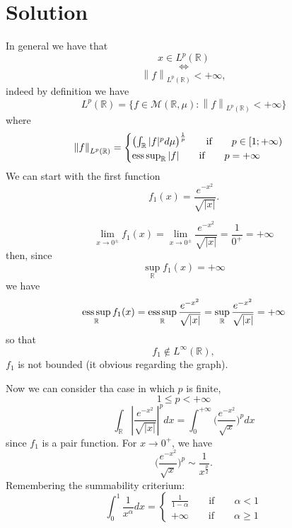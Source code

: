 \documentclass[a4paper, twoside, openany]{book}
\newcommand{\R}{\mathbb{R}}
\newcommand{\esssup}{\operatornamewithlimits{ess\,sup}}
\newcommand{\norm}[1]{\left\lVert#1\right\rVert}
\begin{document}
\section*{Solution}
In general we have that
$$x \in L^p(\R)$$
$$\iff$$
$$\norm{f}_{L^p(\R)} < +\infty,$$
indeed by definition we have
$$L^p(\R) = \{ f \in \mathcal{M}(\R, \mu) : \norm{f}_{L^p(\R)} < +\infty \}$$
where
$$\norm{f}_{L^p(\R)} = \begin{cases}
						\bigl( \int_{\R} |f|^p d \mu \bigl)^{\frac{1}{p}} \qquad \textrm{if} \qquad p \in [1; +\infty) \\
						\esssup_{\R} |f| \qquad \textrm{if} \qquad p = +\infty
					   \end{cases}$$
We can start with the first function
$$f_1(x) = \frac{e^{-x^2}}{\sqrt{|x|}}.$$
\begin{figure}[!ht]
\begin{center}
\end{center}
\end{figure}
$$\lim_{x \rightarrow 0^{\pm}} f_1(x) = \lim_{x \rightarrow 0^{\pm}} \frac{e^{-x^2}}{\sqrt{|x|}} = \frac{1}{0^+} = +\infty$$
then, since
$$\sup_{\R} f_1(x) = +\infty$$
we have
$$\esssup_{\R} f_1(x) = \esssup_{\R} \frac{e^{-x^2}}{\sqrt{|x|}} = \sup_{\R} \frac{e^{-x^2}}{\sqrt{|x|}} = +\infty$$
so that 
$$f_1 \notin L^{\infty}(\R),$$
$f_1$ is not bounded (it obvious regarding the graph). \par  
Now we can consider tha case in which $p$ is finite, 
$$1 \leq p < +\infty$$
$$\int_{\R} |\frac{e^{-x^2}}{\sqrt{|x|}}|^p dx = \int_0^{+\infty} \bigl(\frac{e^{-x^2}}{\sqrt{x}}\bigl)^p dx$$
since $f_1$ is a pair function. For $x \rightarrow 0^+$, we have
$$\bigl(\frac{e^{-x^2}}{\sqrt{x}}\bigl)^p \sim \frac{1}{x^{\frac{p}{2}}}.$$
Remembering the summability criterium:
$$\int_0^1 \frac{1}{x^{\alpha}} dx = \begin{cases}
										\frac{1}{1 - \alpha} \qquad \textrm{if} \qquad \alpha < 1 \\
										+\infty \qquad \textrm{if} \qquad \alpha \geq 1
									\end{cases}$$
\end{document}
